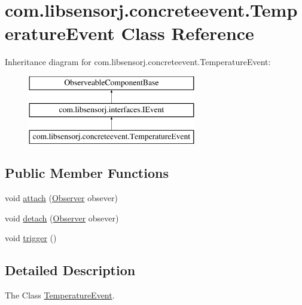 \hypertarget{classcom_1_1libsensorj_1_1concreteevent_1_1TemperatureEvent}{}\section{com.\+libsensorj.\+concreteevent.\+Temperature\+Event Class Reference}
\label{classcom_1_1libsensorj_1_1concreteevent_1_1TemperatureEvent}
Inheritance diagram for com.\+libsensorj.\+concreteevent.\+Temperature\+Event\+:\begin{figure}[H]
\begin{center}
\leavevmode
\includegraphics[height=3.000000cm]{classcom_1_1libsensorj_1_1concreteevent_1_1TemperatureEvent}
\end{center}
\end{figure}
\subsection*{Public Member Functions}
\begin{DoxyCompactItemize}
\item 
void \hyperlink{classcom_1_1libsensorj_1_1concreteevent_1_1TemperatureEvent_ad3499315aef403dfde60cf7d9a42c8cf}{attach} (\hyperlink{classcom_1_1libsensorj_1_1model_1_1Observer}{Observer} obsever)
\item 
void \hyperlink{classcom_1_1libsensorj_1_1concreteevent_1_1TemperatureEvent_a7332f144af23c349f39dd714de9c07b9}{detach} (\hyperlink{classcom_1_1libsensorj_1_1model_1_1Observer}{Observer} obsever)
\item 
void \hyperlink{classcom_1_1libsensorj_1_1concreteevent_1_1TemperatureEvent_ac0fe5a9964739808ece4fc9f2562dca5}{trigger} ()
\end{DoxyCompactItemize}


\subsection{Detailed Description}
The Class \hyperlink{classcom_1_1libsensorj_1_1concreteevent_1_1TemperatureEvent}{Temperature\+Event}. 

